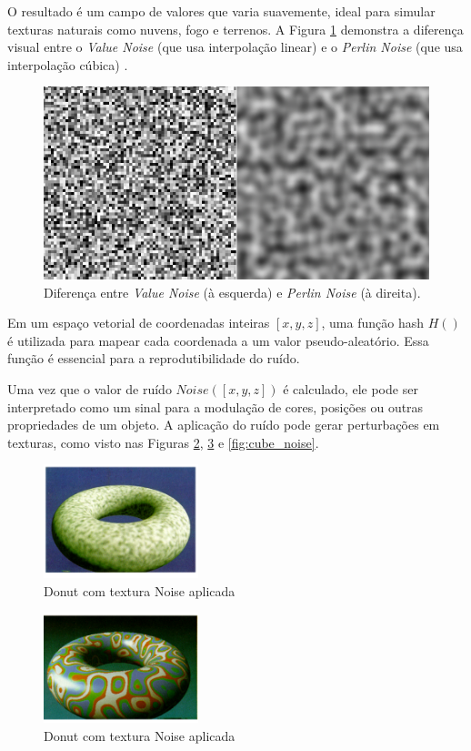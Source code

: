 O resultado é um campo de valores que varia suavemente, ideal para simular texturas naturais como nuvens, fogo e terrenos. A Figura \ref{fig:whitenoise} demonstra a diferença visual entre o \textit{Value Noise} (que usa interpolação linear) e o \textit{Perlin Noise} (que usa interpolação cúbica) \cite{fractalNoise}.

\begin{figure}[H]
    \centering
    \includegraphics[width=0.8\linewidth]{img/noise-whitenoise.png}
    \caption{Diferença entre \textit{Value Noise} (à esquerda) e \textit{Perlin Noise} (à direita).}
    \label{fig:whitenoise}
\end{figure}

Em um espaço vetorial de coordenadas inteiras $[x, y, z]$, uma função hash $H()$ é utilizada para mapear cada coordenada a um valor pseudo-aleatório. Essa função é essencial para a reprodutibilidade do ruído.

Uma vez que o valor de ruído $Noise([x, y, z])$ é calculado, ele pode ser interpretado como um sinal para a modulação de cores, posições ou outras propriedades de um objeto. A aplicação do ruído pode gerar perturbações em texturas, como visto nas Figuras \ref{fig:donut_noise}, \ref{fig:sphere_noise} e \ref{fig:cube_noise}.

\begin{figure}[H]
    \centering
    \includegraphics[width=0.4\textwidth]{img/donut.png}
    \caption{Donut com textura Noise aplicada}
    \label{fig:donut_noise}
\end{figure}

\begin{figure}[H]
    \centering
    \includegraphics[width=0.4\textwidth]{img/donut2.png}
    \caption{Donut com textura Noise aplicada}
    \label{fig:sphere_noise}
\end{figure}

